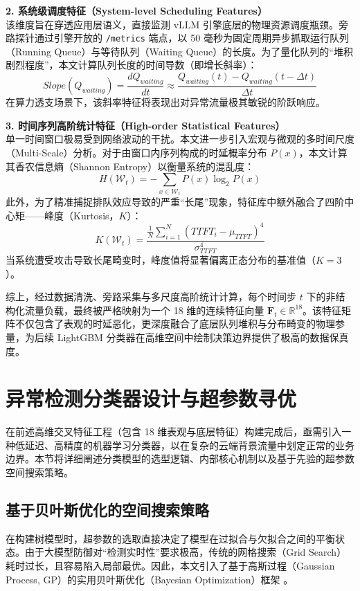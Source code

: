 \documentclass[master, vlined]{DissertUESTC}
\begin{document}
	\textbf{2. 系统级调度特征（System-level Scheduling Features）} \\
	该维度旨在穿透应用层语义，直接监测 vLLM 引擎底层的物理资源调度瓶颈。旁路探针通过引擎开放的 \texttt{/metrics} 端点，以 50 毫秒为固定周期异步抓取运行队列（Running Queue）与等待队列（Waiting Queue）的长度。为了量化队列的“堆积剧烈程度”，本文计算队列长度的时间导数（即增长斜率）：
	\begin{equation}
		Slope(Q_{waiting}) = \frac{dQ_{waiting}}{dt} \approx \frac{Q_{waiting}(t) - Q_{waiting}(t-\Delta t)}{\Delta t}
	\end{equation}
	在算力透支场景下，该斜率特征将表现出对异常流量极其敏锐的阶跃响应。

	\textbf{3. 时间序列高阶统计特征（High-order Statistical Features）} \\
	单一时间窗口极易受到网络波动的干扰。本文进一步引入宏观与微观的多时间尺度（Multi-Scale）分析。对于由窗口内序列构成的时延概率分布 $P(x)$，本文计算其香农信息熵（Shannon Entropy）以衡量系统的混乱度：
	\begin{equation} \label{eq: 特征信息熵}
		H(\mathcal{W}_t) = - \sum_{x \in \mathcal{W}_t} P(x) \log_2 P(x)
	\end{equation}
	此外，为了精准捕捉排队效应导致的严重“长尾”现象，特征库中额外融合了四阶中心矩——峰度（Kurtosis，$K$）：
	\begin{equation}
		K(\mathcal{W}_t) = \frac{\frac{1}{N} \sum_{i=1}^{N} (TTFT_i - \mu_{TTFT})^4}{\sigma_{TTFT}^4}
	\end{equation}
	当系统遭受攻击导致长尾畸变时，峰度值将显著偏离正态分布的基准值（$K=3$）。

	综上，经过数据清洗、旁路采集与多尺度高阶统计计算，每个时间步 $t$ 下的非结构化流量负载，最终被严格映射为一个 18 维的连续特征向量 $\mathbf{F}_t \in \mathbb{R}^{18}$。该特征矩阵不仅包含了表观的时延恶化，更深度融合了底层队列堆积与分布畸变的物理参量，为后续 LightGBM 分类器在高维空间中绘制决策边界提供了极高的数据保真度。

\section{异常检测分类器设计与超参数寻优}

	在前述高维交叉特征工程（包含 18 维表观与底层特征）构建完成后，亟需引入一种低延迟、高精度的机器学习分类器，以在复杂的云端背景流量中划定正常的业务边界。本节将详细阐述分类模型的选型逻辑、内部核心机制以及基于先验的超参数空间搜索策略。

	\subsection{基于贝叶斯优化的空间搜索策略}
	在构建树模型时，超参数的选取直接决定了模型在过拟合与欠拟合之间的平衡状态。由于大模型防御对“检测实时性”要求极高，传统的网格搜索（Grid Search）耗时过长，且容易陷入局部最优。因此，本文引入了基于高斯过程（Gaussian Process, GP）的实用贝叶斯优化（Bayesian Optimization）框架 \cite{机器学习算法的实用贝叶斯优化}。
\end{document}
